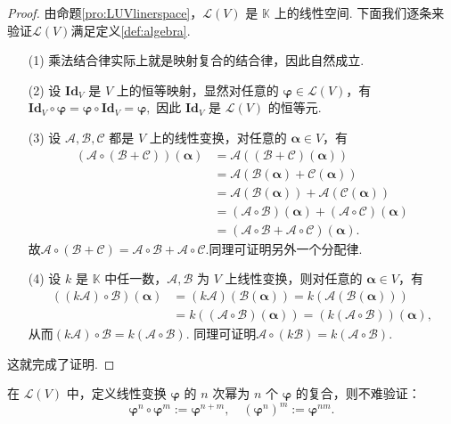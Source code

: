 \documentclass[12pt, a4paper,newtx]{ctexart}
\begin{document}
\begin{proof}
	由命题\ref{pro:LUVlinerspace}，$\mathcal{L}(V)$ 是 $\mathbb{K}$ 上的线性空间. 下面我们逐条来验证$\mathcal{L}(V)$满足定义\ref{def:algebra}. 
	\begin{enumerate}
		\item[(1)] 乘法结合律实际上就是映射复合的结合律，因此自然成立.
		\item[(2)] 设 $\mathbf{Id}_V$ 是 $V$ 上的恒等映射，显然对任意的 $\bm\varphi \in \mathcal{L}(V)$，有$\mathbf{Id}_V \circ \bm{\varphi} = \bm{\varphi} \circ \mathbf{Id}_V = \bm{\varphi},$
		因此 $\mathbf{Id}_V$ 是 $\mathcal{L}(V)$ 的恒等元. 
		\item[(3)]  设 $\mathcal A, \mathcal B, \mathcal C$ 都是 $V$ 上的线性变换，对任意的 $\bm\alpha \in V$，有\begin{align*}
			(\mathcal A \circ (\mathcal B + \mathcal C))(\bm\alpha) &= \mathcal A((\mathcal B + \mathcal C)(\bm\alpha))\\& =\mathcal A(\mathcal B(\bm\alpha) + \mathcal C(\bm\alpha))\\&=\mathcal A(\mathcal B(\bm\alpha)) + \mathcal A(\mathcal C(\bm\alpha))\\&= (\mathcal A \circ \mathcal B)(\bm\alpha) + (\mathcal A \circ \mathcal C)(\bm\alpha)\\&= (\mathcal A \circ \mathcal B + \mathcal A \circ \mathcal C)(\bm\alpha).
		\end{align*}
		故$\mathcal A \circ (\mathcal B + \mathcal C) = \mathcal A \circ \mathcal B + \mathcal A \circ \mathcal C.$同理可证明另外一个分配律. 
		\item[(4)] 设 $k$ 是 $\mathbb{K}$ 中任一数，$\mathcal A, \mathcal B$ 为 $V$ 上线性变换，则对任意的 $\bm\alpha \in V$，有\begin{align*}
			\left((k\mathcal{A}) \circ \mathcal{B}\right)(\bm\alpha) &= (k\mathcal{A})(\mathcal{B}(\bm\alpha)) = k\left(\mathcal{A}(\mathcal{B}(\bm\alpha))\right)\\&=  k\left((\mathcal{A} \circ \mathcal{B})(\bm\alpha)\right) = \left(k(\mathcal{A} \circ \mathcal{B})\right)(\bm\alpha),
		\end{align*}
		从而$(k\mathcal{A}) \circ \mathcal{B} = k(\mathcal{A} \circ \mathcal{B}).$
		同理可证明$\mathcal{A} \circ (k\mathcal{B}) = k(\mathcal{A} \circ \mathcal{B}). $
	\end{enumerate}
	这就完成了证明. 
\end{proof}
在 $\mathcal{L}(V)$ 中，定义线性变换 $\bm\varphi$ 的 $n$ 次幂为 $n$ 个 $\bm\varphi$ 的复合，则不难验证：
\begin{equation}\label{linertransferExponent}
	\bm\varphi^n \circ \bm\varphi^m := \bm\varphi^{n+m}, \quad (\bm\varphi^n)^m := \bm\varphi^{nm}.
\end{equation}
\end{document}
